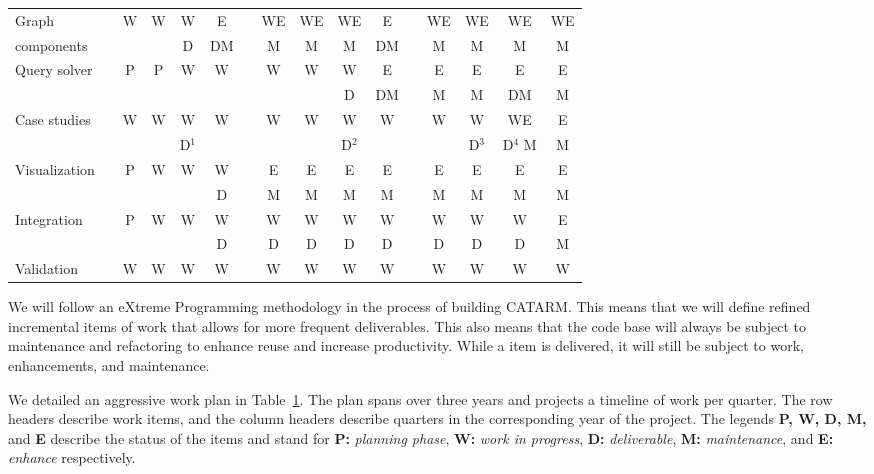 \documentclass[12pt]{article}
\begin{document}
{\begin{table}[bt]
\begin{tabular}{lp{.1cm}ccccp{.1cm}ccccp{.1cm}cccc}
Graph  & & 
W & W & W & E & & WE & WE & WE & E & & WE & WE & WE & WE \\ 
components & & 
 &  & D & DM & & M & M & M & DM & & M & M & M & M \\ \hline

\multirow{2}{*}{Query solver} & & 
P & P & W & W & & W & W & W & E & & E & E & E & E \\ 
& & 
 &  &  &  & &  &  & D & DM & & M & M & DM & M \\ \hline

\multirow{2}{*}{Case studies} & & 
W & W & W & W & & W & W & W & W & & W & W & WE & E \\ 
& & 
 &  & D$^1$ &  & &  &  & D$^2$ &  & &  & D$^3$ & D$^4$ M & M \\ \hline

\multirow{2}{*}{Visualization} & & 
P & W & W & W & & E & E & E & E & & E & E & E & E \\ 
& & 
 &  &  & D & & M & M & M & M & & M & M & M & M \\ \hline

\multirow{2}{*}{Integration} & & 
P & W & W & W & & W & W & W & W & & W & W & W & E \\ 
& & 
 &  &  & D & & D & D & D & D & & D & D & D & M \\  \hline

Validation & & 
W & W & W & W & & W & W & W & W & & W & W & W & W \\  \bottomrule
\end{tabular}
\normalsize
\label{t:workplan}
\end{table}

We will follow an eXtreme Programming 
methodology in the process of building CATARM.
This means that we will define refined incremental items of 
work that allows for more frequent deliverables. 
This also means that the code base will always be subject
to maintenance and refactoring to enhance reuse and 
increase productivity. 
While a item is delivered, it will still be subject to work,
enhancements, and maintenance. 

We detailed an aggressive work plan in Table~\ref{t:workplan}. 
The plan spans over three years and projects a timeline
of work per quarter. 
The row headers describe work items, and the column headers
describe quarters in the corresponding year of the project.
The legends {\bf P, W, D, M, } 
and {\bf E} 
describe the status of the items 
and stand for 
{\bf P:} {\em planning phase}, 
{\bf W:} {\em work in progress}, 
{\bf D:} {\em deliverable}, 
{\bf M:}  {\em maintenance}, 
and 
{\bf E: } {\em enhance} respectively. 

}
\end{document}
